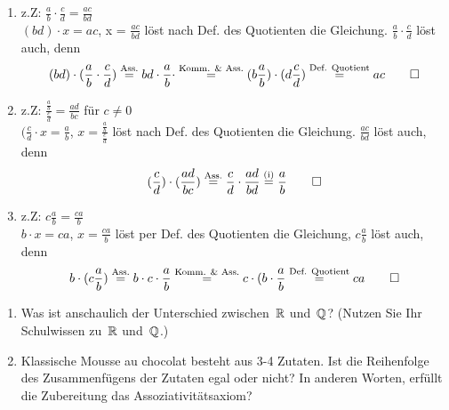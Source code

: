 \bigskip

\begin{comment}
\newcommand\Asseq{\stackrel{\mathclap{\normalfont\fontsize{4}\mbox{Ass.}}}{=}}
\newcommand\KommAsseq{\stackrel{\mathclap{\normalfont\fontsize{4}\mbox{Komm. & Ass.}}}{=}}
\newcommand\Defeq{\stackrel{\mathclap{\normalfont\fontsize{4}\mbox{Def. Quotient}}}{=}}
\newcommand\ieq{\stackrel{\mathclap{\normalfont\fontsize{4}\mbox{(i)}}}{=}}
\end{comment}


\newcommand\Asseq{\stackrel{\text{Ass.}}{=}}
\newcommand\KommAsseq{\stackrel{\text{Komm. \& Ass.}}{=}}
\newcommand\Defeq{\stackrel{\text{Def. Quotient}}{=}}
\newcommand\ieq{\stackrel{\text{(i)}}{=}}

\begin{lsg}
\begin{enumerate}[label=$\mathrm{(\roman*)}$, ref=$\mathrm{\roman*}$]
\item z.Z: $\frac{a}{b} \cdot \frac{c}{d} = \frac{ac}{bd}$\\
$(bd) \cdot x = ac$, x = $\frac{ac}{bd}$ l\"ost nach Def. des Quotienten die Gleichung.
$\frac{a}{b} \cdot \frac{c}{d}$ l\"ost auch, denn 
\[
(bd) \cdot (\frac{a}{b} \cdot \frac{c}{d}) \Asseq 
bd \cdot \frac{a}{b} \cdot \KommAsseq (b \frac{a}{b}) \cdot (d\frac{c}{d}) \Defeq ac \qed
\]
\item z.Z: $\frac{\frac{a}{b}}{\frac{c}{d}} = \frac{ad}{bc}$ f\"ur $c\not=0$\\
$(\frac{c}{d} \cdot x = \frac{a}{b}$, $x = \frac{\frac{a}{b}}{\frac{c}{d}}$ l\"ost nach Def. des Quotienten die Gleichung. $\frac{ac}{bd}$ l\"ost auch, denn
\[
(\frac{c}{d}) \cdot (\frac{ad}{bc}) \Asseq 
\frac{c}{d} \cdot \frac{ad}{bd} \ieq \frac{a}{b} \qed
\]
\item z.Z: $c\frac{a}{b} = \frac{ca}{b}$\\
$b \cdot x = ca$, $x = \frac{ca}{b}$ l\"ost per Def. des Quotienten die Gleichung, $c\frac{a}{b}$ l\"ost auch, denn
\[
b \cdot (c\frac{a}{b}) \Asseq 
b \cdot c \cdot \frac{a}{b} \KommAsseq c \cdot (b \cdot \frac{a}{b} \Defeq ca \qed
\]
\end{enumerate}
\end{lsg}

\bigskip


\begin{aufg}[4 Punkte]
\begin{enumerate}[label=$\mathrm{(\roman*)}$, ref=$\mathrm{\roman*}$]
\item Was ist anschaulich der Unterschied zwischen~$\mathbb{R}$ und~$\mathbb{Q}$? (Nutzen Sie Ihr Schulwissen zu~$\mathbb{R}$ und~$\mathbb{Q}$.)
\item Klassische Mousse au chocolat besteht aus 3-4 Zutaten. Ist die Reihenfolge des Zusammenf\"ugens der Zutaten egal oder nicht? In anderen Worten, erf\"ullt die Zubereitung das Assoziativit\"atsaxiom?
\end{enumerate}
\end{aufg}
 
